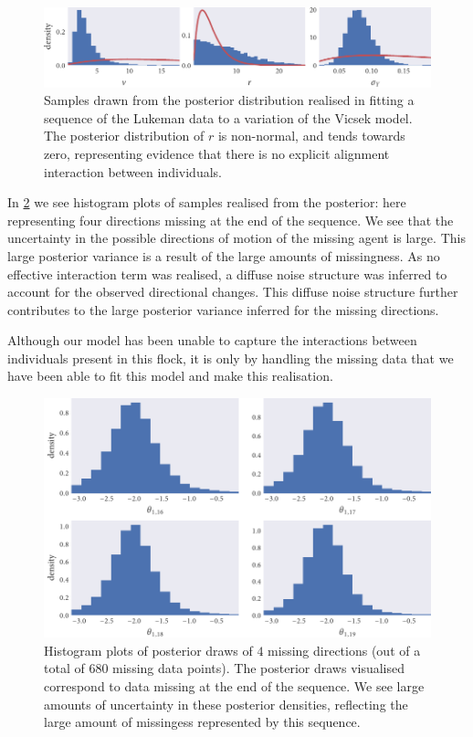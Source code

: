 \begin{figure}[tb]
  \includegraphics{params_hist.pdf}
  \caption{Samples drawn from the posterior distribution realised in fitting a
    sequence of the Lukeman data to a variation of the Vicsek model. The
    posterior distribution of $r$ is non-normal, and tends towards zero,
    representing evidence that there is no explicit alignment interaction
    between individuals.}
  \label{fig:lukeman_params}
\end{figure}

In \cref{fig:dir_hist} we see histogram plots of samples realised from the
posterior: here representing four directions missing at the end of the
sequence. We see that the uncertainty in the possible directions of motion of
the missing agent is large. This large posterior variance is a result of the
large amounts of missingness. As no effective interaction term was realised, a
diffuse noise structure was inferred to account for the observed directional
changes. This diffuse noise structure further contributes to the large
posterior variance inferred for the missing directions.

Although our model has been unable to capture the interactions between
individuals present in this flock, it is only by handling the missing data that
we have been able to fit this model and make this realisation.

\begin{figure}[tb]
  \includegraphics{dir_hist.pdf}
  \caption{Histogram plots of posterior draws of $4$ missing directions (out of
    a total of $680$ missing data points). The posterior draws visualised
    correspond to data missing at the end of the sequence. We see large amounts
    of uncertainty in these posterior densities, reflecting the large amount of
    missingess represented by this sequence.}
  \label{fig:dir_hist}
\end{figure}

